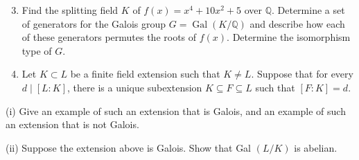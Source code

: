 \documentclass[10pt]{article}
\begin{document}
\begin{enumerate}
  \setcounter{enumi}{2}
  \item Find the splitting field $K$ of $f(x)=x^{4}+10 x^{2}+5$ over $\mathbb{Q}$. Determine a set of generators for the Galois group $G=\operatorname{Gal}(K / \mathbb{Q})$ and describe how each of these generators permutes the roots of $f(x)$. Determine the isomorphism type of $G$.

  \item Let $K \subset L$ be a finite field extension such that $K \neq L$. Suppose that for every $d \mid[L: K]$, there is a unique subextension $K \subseteq F \subseteq L$ such that $[F: K]=d .$

\end{enumerate}
(i) Give an example of such an extension that is Galois, and an example of such an extension that is not Galois.

(ii) Suppose the extension above is Galois. Show that Gal $(L / K)$ is abelian.
\end{document}
